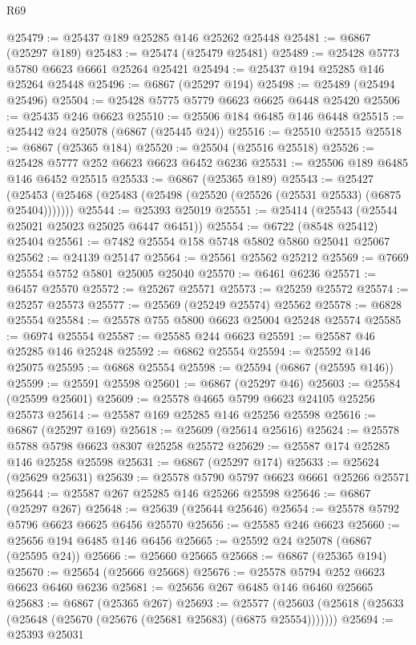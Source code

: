 \begin{lexlean}{R69}
\begin{coremodule}
{@25479 := @25437 @189 @25285 @146 @25262 @25448
@25481 := @6867 (@25297 @189)
@25483 := @25474 (@25479 @25481)
@25489 := @25428 @5773 @5780 @6623 @6661 @25264 @25421
@25494 := @25437 @194 @25285 @146 @25264 @25448
@25496 := @6867 (@25297 @194)
@25498 := @25489 (@25494 @25496)
@25504 := @25428 @5775 @5779 @6623 @6625 @6448 @25420
@25506 := @25435 @246 @6623
@25510 := @25506 @184 @6485 @146 @6448
@25515 := @25442 @24 @25078 (@6867 (@25445 @24))
@25516 := @25510 @25515
@25518 := @6867 (@25365 @184)
@25520 := @25504 (@25516 @25518)
@25526 := @25428 @5777 @252 @6623 @6623 @6452 @6236
@25531 := @25506 @189 @6485 @146 @6452 @25515
@25533 := @6867 (@25365 @189)
@25543 := @25427
    (@25453 (@25468 (@25483 (@25498 (@25520 (@25526 (@25531 @25533) (@6875 @25404)))))))
@25544 := @25393 @25019
@25551 := @25414 (@25543 (@25544 @25021 @25023 @25025 @6447 @6451))
@25554 := @6722 (@8548 @25412) @25404
@25561 := @7482 @25554 @158 @5748 @5802 @5860 @25041 @25067
@25562 := @24139 @25147
@25564 := @25561 @25562 @25212
@25569 := @7669 @25554 @5752 @5801 @25005 @25040
@25570 := @6461 @6236
@25571 := @6457 @25570
@25572 := @25267 @25571
@25573 := @25259 @25572
@25574 := @25257 @25573
@25577 := @25569 (@25249 @25574) @25562
@25578 := @6828 @25554
@25584 := @25578 @755 @5800 @6623 @25004 @25248 @25574
@25585 := @6974 @25554
@25587 := @25585 @244 @6623
@25591 := @25587 @46 @25285 @146 @25248
@25592 := @6862 @25554
@25594 := @25592 @146 @25075
@25595 := @6868 @25554
@25598 := @25594 (@6867 (@25595 @146))
@25599 := @25591 @25598
@25601 := @6867 (@25297 @46)
@25603 := @25584 (@25599 @25601)
@25609 := @25578 @4665 @5799 @6623 @24105 @25256 @25573
@25614 := @25587 @169 @25285 @146 @25256 @25598
@25616 := @6867 (@25297 @169)
@25618 := @25609 (@25614 @25616)
@25624 := @25578 @5788 @5798 @6623 @8307 @25258 @25572
@25629 := @25587 @174 @25285 @146 @25258 @25598
@25631 := @6867 (@25297 @174)
@25633 := @25624 (@25629 @25631)
@25639 := @25578 @5790 @5797 @6623 @6661 @25266 @25571
@25644 := @25587 @267 @25285 @146 @25266 @25598
@25646 := @6867 (@25297 @267)
@25648 := @25639 (@25644 @25646)
@25654 := @25578 @5792 @5796 @6623 @6625 @6456 @25570
@25656 := @25585 @246 @6623
@25660 := @25656 @194 @6485 @146 @6456
@25665 := @25592 @24 @25078 (@6867 (@25595 @24))
@25666 := @25660 @25665
@25668 := @6867 (@25365 @194)
@25670 := @25654 (@25666 @25668)
@25676 := @25578 @5794 @252 @6623 @6623 @6460 @6236
@25681 := @25656 @267 @6485 @146 @6460 @25665
@25683 := @6867 (@25365 @267)
@25693 := @25577
    (@25603 (@25618 (@25633 (@25648 (@25670 (@25676 (@25681 @25683) (@6875 @25554)))))))
@25694 := @25393 @25031
}
\end{coremodule}
\end{lexlean}
